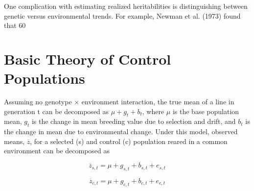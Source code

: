 \documentclass{article}
\begin{document}
One complication with estimating realized heritabilities is distinguishing between genetic versus environmental trends. For example, Newman et al. (1973) found that 60%

\section{Basic Theory of Control Populations}
Assuming no genotype × environment interaction, the true mean of a line in generation t can be decomposed as  $ \mu + g_t + b_t $, where  $ \mu $ is the base population mean,  $ g_t $ is the change in mean breeding value due to selection and drift, and  $ b_t $ is the change in mean due to environmental change. Under this model, observed means,  $ \overline{z} $, for a selected (s) and control (c) population reared in a common environment can be decomposed as

\begin{equation}
\overline{z}_{s,t}=\mu+g_{s,t}+b_{s,t}+e_{s,t}
\tag{18.23a}
\label{eq:18_23a}
\end{equation}

\begin{equation}
\overline{z}_{c,t}=\mu+g_{c,t}+b_{c,t}+e_{c,t}
\tag{18.23b}
\label{eq:18_23b}
\end{equation}
\end{document}
